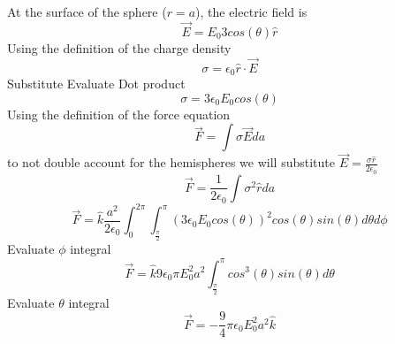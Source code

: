 \documentclass[12pt]{article}
\begin{document}
    At the surface of the sphere ($r=a$), the electric field is 
    \begin{equation} \label{eq: 4.1.5}
        \vec{E} = E_0 3 cos(\theta) \hat{r}
    \end{equation}
    Using the definition of the charge density
    \begin{equation} \label{eq: 4.1.6}
        \sigma = \epsilon_0 \hat{r} \cdot \vec{E}
    \end{equation}
    Substitute
    \newline Evaluate Dot product
    \begin{equation} \label{eq: 4.1.7}
        \sigma = 3 \epsilon_0 E_0 cos(\theta)
    \end{equation}
    Using the definition of the force equation
    \begin{equation} \label{eq: 4.1.8}
        \vec{F} = \int \sigma \vec{E} da
    \end{equation}
    to not double account for the hemispheres we will substitute $\vec{E}=\frac{\sigma \hat{r}}{2 \epsilon_0}$
    \begin{equation} \label{eq: 4.1.9}
        \vec{F} = \frac{1}{2 \epsilon_0} \int \sigma^2 \hat{r} da
    \end{equation}
    \begin{equation} \label{eq: 4.1.10}
        \vec{F} = \hat{k} \frac{a^2}{2 \epsilon_0} \int_0^{2\pi} \int_{\frac{\pi}{2}}^\pi (3 \epsilon_0 E_0 cos(\theta))^2 cos(\theta) sin(\theta) d\theta d\phi
    \end{equation}
    Evaluate $\phi$ integral
    \begin{equation} \label{eq: 4.1.11}
        \vec{F} = \hat{k} 9 \epsilon_0 \pi E_0^2 a^2 \int_{\frac{\pi}{2}}^\pi  cos^3(\theta) sin(\theta) d\theta
    \end{equation}
    Evaluate $\theta$ integral
    \begin{equation} \label{eq: 4.1.12}
        \vec{F} = -\frac{9}{4} \pi \epsilon_0 E_0^2 a^2 \hat{k}
    \end{equation}
\end{document}
